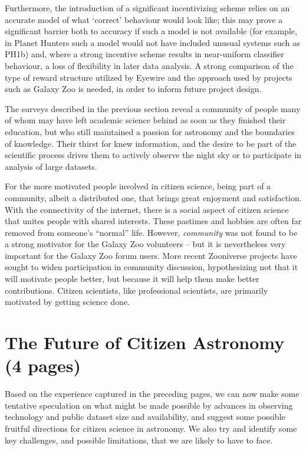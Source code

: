 \documentclass{ar2e}
\begin{document}
Furthermore, the introduction of a significant incentivizing scheme relies on an
accurate model of what `correct' behaviour would look like; this may prove a
significant barrier both to accuracy if such a model is not available (for
example, in Planet Hunters such a model would not have included unusual systems
such as PH1b) and, where a strong incentive scheme results in near-uniform
classifier behaviour, a loss of flexibility in later data analysis. 
A strong comparison of the type of reward structure utilized by Eyewire and the
approach used by projects such as Galaxy Zoo is needed, in order to
inform future project design. 

The surveys described in the previous section reveal a community of people many
of whom may have left   academic science behind as soon as they finished their 
education, but who still maintained a passion for astronomy and the  boundaries
of knowledge.  Their thirst for knew information, and the  desire to be part of
the  scientific process drives them to actively observe the  night sky or to
participate in analysis of large datasets.  

For the more motivated people involved in citizen science, being part of a
community,  albeit a distributed one, that brings great enjoyment and
satisfaction.  With the connectivity of the internet, there is a social  aspect
of citizen science that unites people with shared interests.   These pastimes
and hobbies are often far removed from someone's ``normal''  life. However, {\it
community} was not found to be a strong motivator for the Galaxy Zoo volunteers
-- but it is nevertheless very important for the Galaxy Zoo forum users. More
recent Zooniverse projects have sought to widen participation in community
discussion, hypothesizing not that it will motivate people better, but because
it will help them make better contributions. Citizen scientists, like
professional scientists, are primarily motivated by getting science done.



\section{The Future of Citizen Astronomy (4 pages)}
\label{sec:future}

Based on the experience captured in the preceding pages, we can now make some
tentative speculation on what might be made possible by advances in observing
technology and public dataset size and availability, and suggest some possible
fruitful directions for citizen science in astronomy. We also try and identify
some key challenges, and possible limitations, that we are likely to have to
face.
\end{document}
